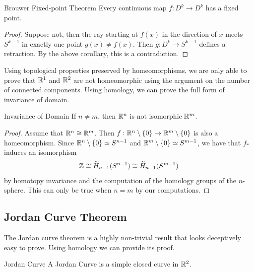 \documentclass[a4paper]{article}
\begin{document}
\begin{crl}{Brouwer Fixed-point Theorem}{} Every continuous map $f:D^k\to D^k$ has a fixed point. \tcbline
\begin{proof}
Suppose not, then the ray starting at $f(x)$ in the direction of $x$ meets $S^{k-1}$ in exactly one point $g(x)\neq f(x)$. Then $g:D^k\to S^{k-1}$ defines a retraction. By the above corollary, this is a contradiction. 
\end{proof}
\end{crl}

Using topological properties preserved by homeomorphisms, we are only able to prove that $\mathbb{R}^1$ and $\mathbb{R}^2$ are not homeomorphic using the argument on the number of connected components. Using homology, we can prove the full form of invariance of domain. 

\begin{crl}{Invariance of Domain}{} If $n\neq m$, then $\mathbb{R}^n$ is not isomorphic $\mathbb{R}^m$. \tcbline
\begin{proof}
Assume that $\mathbb{R}^n\cong\mathbb{R}^m$. Then $f:\mathbb{R}^n\setminus\{0\}\to\mathbb{R}^m\setminus\{0\}$ is also a homeomorphism. Since $\mathbb{R}^n\setminus\{0\}\simeq S^{n-1}$ and $\mathbb{R}^m\setminus\{0\}\simeq S^{m-1}$, we have that $f_\ast$ induces an isomorphism $$\mathbb{Z}\cong\widetilde{H}_{n-1}(S^{n-1})\cong\widetilde{H}_{n-1}(S^{m-1})$$ by homotopy invariance and the computation of the homology groups of the $n$-sphere. This can only be true when $n=m$ by our computations. 
\end{proof}
\end{crl}

\subsection{Jordan Curve Theorem}
The Jordan curve theorem is a highly non-trivial result that looks deceptively easy to prove. Using homology we can provide its proof. 

\begin{defn}{Jordan Curve}{} A Jordan Curve is a simple closed curve in $\mathbb{R}^2$. 
\end{defn}
\end{document}
